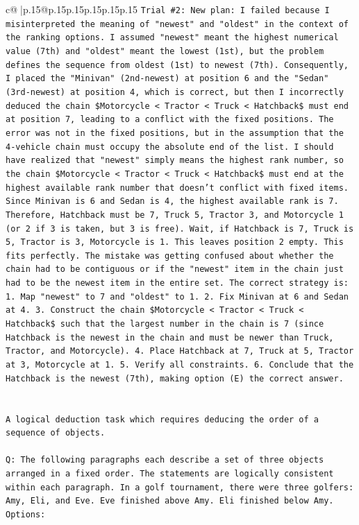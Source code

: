\documentclass{article}
\begin{document}
{\begin{supertabular}{c@{$\;$}|p{.15\linewidth}@{}p{.15\linewidth}p{.15\linewidth}p{.15\linewidth}p{.15\linewidth}p{.15\linewidth}}
{{{\texttt{Trial \#2: New plan: I failed because I misinterpreted the meaning of "newest" and "oldest" in the context of the ranking options. I assumed "newest" meant the highest numerical value (7th) and "oldest" meant the lowest (1st), but the problem defines the sequence from oldest (1st) to newest (7th). Consequently, I placed the "Minivan" (2nd{-}newest) at position 6 and the "Sedan" (3rd{-}newest) at position 4, which is correct, but then I incorrectly deduced the chain \$Motorcycle < Tractor < Truck < Hatchback\$ must end at position 7, leading to a conflict with the fixed positions. The error was not in the fixed positions, but in the assumption that the 4{-}vehicle chain must occupy the absolute end of the list. I should have realized that "newest" simply means the highest rank number, so the chain \$Motorcycle < Tractor < Truck < Hatchback\$ must end at the highest available rank number that doesn't conflict with fixed items. Since Minivan is 6 and Sedan is 4, the highest available rank is 7. Therefore, Hatchback must be 7, Truck 5, Tractor 3, and Motorcycle 1 (or 2 if 3 is taken, but 3 is free). Wait, if Hatchback is 7, Truck is 5, Tractor is 3, Motorcycle is 1. This leaves position 2 empty. This fits perfectly. The mistake was getting confused about whether the chain had to be contiguous or if the "newest" item in the chain just had to be the newest item in the entire set. The correct strategy is: 1. Map "newest" to 7 and "oldest" to 1. 2. Fix Minivan at 6 and Sedan at 4. 3. Construct the chain \$Motorcycle < Tractor < Truck < Hatchback\$ such that the largest number in the chain is 7 (since Hatchback is the newest in the chain and must be newer than Truck, Tractor, and Motorcycle). 4. Place Hatchback at 7, Truck at 5, Tractor at 3, Motorcycle at 1. 5. Verify all constraints. 6. Conclude that the Hatchback is the newest (7th), making option (E) the correct answer.} \\
\\ 
\\ 
\texttt{A logical deduction task which requires deducing the order of a sequence of objects.} \\
\\ 
\texttt{Q: The following paragraphs each describe a set of three objects arranged in a fixed order. The statements are logically consistent within each paragraph. In a golf tournament, there were three golfers: Amy, Eli, and Eve. Eve finished above Amy. Eli finished below Amy.} \\
\texttt{Options:} \\
}}}
\end{supertabular}}
\end{document}
